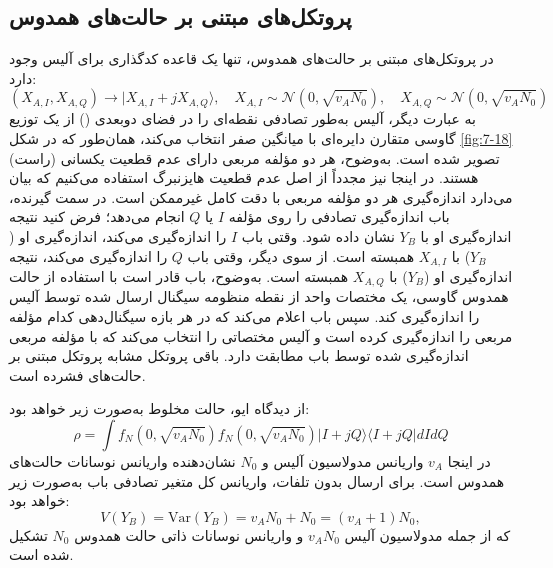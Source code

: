 \subsection{پروتکل‌های مبتنی بر حالت‌های همدوس}
\label{sec:7-6-2}
در پروتکل‌های مبتنی بر حالت‌های همدوس، تنها یک قاعده کدگذاری برای آلیس وجود دارد:
\begin{equation}
	(X_{A,I}, X_{A,Q}) \rightarrow |X_{A,I} + jX_{A,Q} \rangle, \quad X_{A,I} \sim \mathcal{N}(0, \sqrt{v_A N_0}), \quad X_{A,Q} \sim \mathcal{N}(0, \sqrt{v_A N_0})
	\label{eq:7-108}
\end{equation}
به عبارت دیگر، آلیس به‌طور تصادفی نقطه‌ای را در فضای دو‌بعدی () از یک توزیع گاوسی متقارن دایره‌ای با میانگین صفر انتخاب می‌کند، همان‌طور که در شکل \ref{fig:7-18} (راست) تصویر شده است. به‌وضوح، هر دو مؤلفه مربعی دارای عدم قطعیت یکسانی هستند. در اینجا نیز مجدداً از اصل عدم قطعیت هایزنبرگ استفاده می‌کنیم که بیان می‌دارد اندازه‌گیری هر دو مؤلفه مربعی با دقت کامل غیرممکن است. در سمت گیرنده، باب اندازه‌گیری تصادفی را روی مؤلفه $I$ یا $Q$ انجام می‌دهد؛ فرض کنید نتیجه اندازه‌گیری او با $Y_B$ نشان داده شود. وقتی باب $I$ را اندازه‌گیری می‌کند، اندازه‌گیری او ($Y_B$) با $X_{A,I}$ همبسته است. از سوی دیگر، وقتی باب $Q$ را اندازه‌گیری می‌کند، نتیجه اندازه‌گیری او ($Y_B$) با $X_{A,Q}$ همبسته است. به‌وضوح، باب قادر است با استفاده از حالت همدوس گاوسی، یک مختصات واحد از نقطه منظومه سیگنال ارسال شده توسط آلیس را اندازه‌گیری کند. سپس باب اعلام می‌کند که در هر بازه سیگنال‌دهی کدام مؤلفه مربعی را اندازه‌گیری کرده است و آلیس مختصاتی را انتخاب می‌کند که با مؤلفه مربعی اندازه‌گیری شده توسط باب مطابقت دارد. باقی پروتکل مشابه پروتکل مبتنی بر حالت‌های فشرده است.

از دیدگاه ایو، حالت مخلوط به‌صورت زیر خواهد بود:
\begin{equation}
	\rho = \int f_N(0, \sqrt{v_A N_0}) f_N(0, \sqrt{v_A N_0}) |I + jQ \rangle \langle I + jQ| dI dQ
	\label{eq:7-109}
\end{equation}
در اینجا $v_A$ واریانس مدولاسیون آلیس و $N_0$ نشان‌دهنده واریانس نوسانات حالت‌های همدوس است. برای ارسال بدون تلفات، واریانس کل متغیر تصادفی باب به‌صورت زیر خواهد بود:
\begin{equation}
	V(Y_B) = \text{Var}(Y_B) = v_A N_0 + N_0 = (v_A + 1)N_0,
	\label{eq:7-110}
\end{equation}
که از جمله مدولاسیون آلیس $v_A N_0$ و واریانس نوسانات ذاتی حالت همدوس $N_0$ تشکیل شده است.

